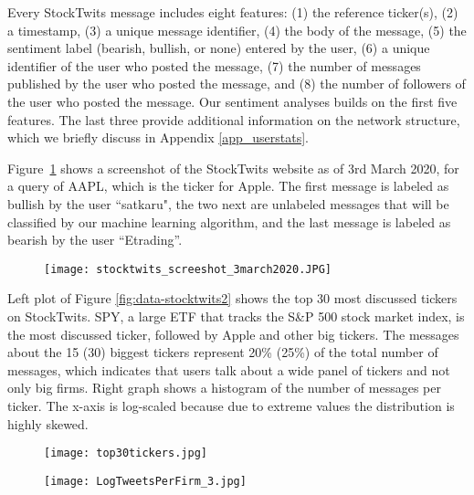 Every StockTwits message includes eight features: (1) the reference ticker(s), (2) a timestamp, (3) a unique message identifier, (4) the body of the message, (5) the sentiment label (bearish, bullish, or none) entered by the user, (6) a unique identifier of the user who posted the message, (7) the number of messages published by the user who posted the message, and (8) the number of followers of the user who posted the message. Our sentiment analyses builds on the first five features. The last three provide additional information on the network structure, which we briefly discuss in Appendix \ref{app_userstats}.

Figure~\ref{screenshot} shows a screenshot of the StockTwits website as of 3rd March 2020, for a query of AAPL, which is the ticker for Apple. The first message is labeled as bullish by the user ``satkaru", the two next are unlabeled messages that will be classified by our machine learning algorithm, and the last message is labeled as bearish by the user ``Etrading''. 

\begin{figure}[h]
\centering
\texttt{[image: stocktwits\_screeshot\_3march2020.JPG]}
\label{screenshot}
\end{figure}


Left plot of Figure \ref{fig:data-stocktwits2} shows the top 30 most discussed tickers on StockTwits. SPY, a large ETF that tracks the S\&P 500 stock market index, is the most discussed ticker, followed by Apple and other big tickers. The messages about the 15 (30) biggest tickers represent 20\% (25\%) of the total number of messages, which indicates that users talk about a wide panel of tickers and not only big firms. Right graph shows a histogram of the number of messages per ticker. The x-axis is log-scaled because due to extreme values the distribution is highly skewed. 

\begin{figure*}[h]
\centering
\begin{subfigure}{0.49\textwidth}  
            \centering 
            \texttt{[image: top30tickers.jpg]}
        \end{subfigure}
        \begin{subfigure}{0.49\textwidth}   
            \centering 
            \texttt{[image: LogTweetsPerFirm\_3.jpg]}
        \end{subfigure}
        \label{fig:data-stocktwits2}
\end{figure*}


